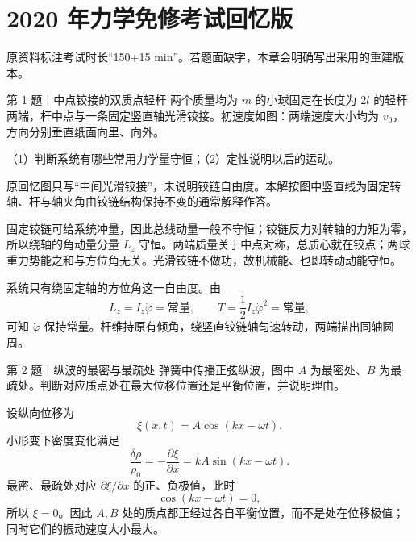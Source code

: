 \chapter{2020 年力学免修考试回忆版}
\noindent{}\quad{}\qquad 原资料标注考试时长“150+15 min”。若题面缺字，本章会明确写出采用的重建版本。

\begin{problem}{第 1 题｜中点铰接的双质点轻杆}
两个质量均为 $m$ 的小球固定在长度为 $2l$ 的轻杆两端，杆中点与一条固定竖直轴光滑铰接。初速度如图：两端速度大小均为 $v_0$，方向分别垂直纸面向里、向外。

（1）判断系统有哪些常用力学量守恒；（2）定性说明以后的运动。
\FigHingedRod
\end{problem}
\begin{identification}
原回忆图只写“中间光滑铰接”，未说明铰链自由度。本解按图中竖直线为固定转轴、杆与轴夹角由铰链结构保持不变的通常解释作答。
\end{identification}
\begin{solution}
固定铰链可给系统冲量，因此总线动量一般不守恒；铰链反力对转轴的力矩为零，所以绕轴的角动量分量 $L_z$ 守恒。两端质量关于中点对称，总质心就在铰点；两球重力势能之和与方位角无关。光滑铰链不做功，故机械能、也即转动动能守恒。

系统只有绕固定轴的方位角这一自由度。由
\[
L_z=I_z\dot\varphi=\text{常量},
\qquad
T=\frac12I_z\dot\varphi^2=\text{常量},
\]
可知 $\dot\varphi$ 保持常量。杆维持原有倾角，绕竖直铰链轴匀速转动，两端描出同轴圆周。
\end{solution}

\begin{problem}{第 2 题｜纵波的最密与最疏处}
弹簧中传播正弦纵波，图中 $A$ 为最密处、$B$ 为最疏处。判断对应质点处在最大位移位置还是平衡位置，并说明理由。
\FigLongWave
\end{problem}
\begin{solution}
设纵向位移为
\[
\xi(x,t)=A\cos(kx-\omega t).
\]
小形变下密度变化满足
\[
\frac{\delta\rho}{\rho_0}=-\frac{\partial\xi}{\partial x}=kA\sin(kx-\omega t).
\]
最密、最疏处对应 $\partial\xi/\partial x$ 的正、负极值，此时
\[
\cos(kx-\omega t)=0,
\]
所以 $\xi=0$。因此 $A,B$ 处的质点都正经过各自平衡位置，而不是处在位移极值；同时它们的振动速度大小最大。
\end{solution}

